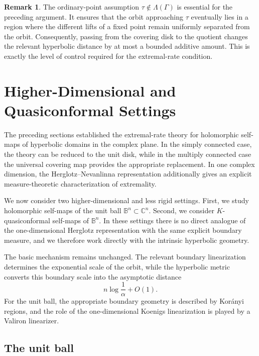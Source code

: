 \documentclass[12pt]{amsart}
\numberwithin{equation}{section}
\theoremstyle{plain}
\theoremstyle{definition}
\newtheorem{remark}[equation]{Remark}
\begin{document}
\begin{remark}
The ordinary-point assumption
$\tau\notin\Lambda(\Gamma)$ is essential for the preceding argument. It
ensures that the orbit approaching $\tau$ eventually lies in a region
where the different lifts of a fixed point remain uniformly separated
from the orbit. Consequently, passing from the covering disk to the
quotient changes the relevant hyperbolic distance by at most a bounded
additive amount. This is exactly the level of control required for the
extremal-rate condition.
\end{remark}


\section{Higher-Dimensional and Quasiconformal Settings}
\label{sec:higher}

The preceding sections established the extremal-rate theory for
holomorphic self-maps of hyperbolic domains in the complex plane. In the
simply connected case, the theory can be reduced to the unit disk, while
in the multiply connected case the universal covering map provides the
appropriate replacement. In one complex dimension, the Herglotz--Nevanlinna
representation additionally gives an explicit measure-theoretic
characterization of extremality.

We now consider two higher-dimensional and less rigid settings. First, we
study holomorphic self-maps of the unit ball
$\mathbb B^n\subset\mathbb C^n$. Second, we consider
$K$-quasiconformal self-maps of $\mathbb B^n$. In these settings there is
no direct analogue of the one-dimensional Herglotz representation with
the same explicit boundary measure, and we therefore work directly with
the intrinsic hyperbolic geometry.

The basic mechanism remains unchanged. The relevant boundary
linearization determines the exponential scale of the orbit, while the
hyperbolic metric converts this boundary scale into the asymptotic
distance
\begin{equation*}
n\log\frac1\alpha+O(1).
\end{equation*}
For the unit ball, the appropriate boundary geometry is described by
Kor\'anyi regions, and the role of the one-dimensional Koenigs
linearization is played by a Valiron linearizer.

\subsection{The unit ball}
\label{subsec:ball}
\end{document}
